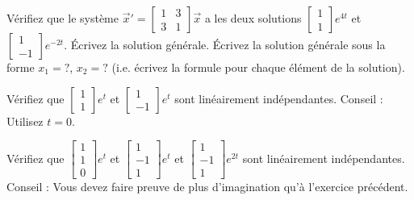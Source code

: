 \begin{exercise}
\leavevmode
\begin{tasks}
\task
Vérifiez que le système ${\vec{x}}' =
\left[ \begin{smallmatrix}
1 & 3 \\ 3 & 1
\end{smallmatrix} \right] \vec{x}$ a les deux solutions
$\left[ \begin{smallmatrix}
1 \\ 1
\end{smallmatrix} \right] e^{4t}$ et
$\left[ \begin{smallmatrix}
1 \\ -1
\end{smallmatrix} \right] e^{-2t}$.
\task
Écrivez la solution générale.
\task
Écrivez la solution générale sous la forme $x_1 = ?$, $x_2 = ?$
(i.e. écrivez la formule pour chaque élément de la solution).
\end{tasks}
\end{exercise}

\begin{exercise}
Vérifiez que
$\left[ \begin{smallmatrix}
1 \\ 1
\end{smallmatrix} \right] e^{t}$ et
$\left[ \begin{smallmatrix}
1 \\ -1
\end{smallmatrix} \right] e^{t}$ 
sont linéairement indépendantes. Conseil : Utilisez $t=0$.
\end{exercise}

\begin{exercise}
Vérifiez que
$\left[ \begin{smallmatrix}
1 \\ 1 \\ 0
\end{smallmatrix} \right] e^{t}$ et
$\left[ \begin{smallmatrix}
1 \\ -1 \\ 1
\end{smallmatrix} \right] e^{t}$ 
et
$\left[ \begin{smallmatrix}
1 \\ -1 \\ 1
\end{smallmatrix} \right] e^{2t}$ 
sont linéairement indépendantes. Conseil : Vous devez faire preuve de plus d'imagination qu'à l'exercice précédent.
\end{exercise}


